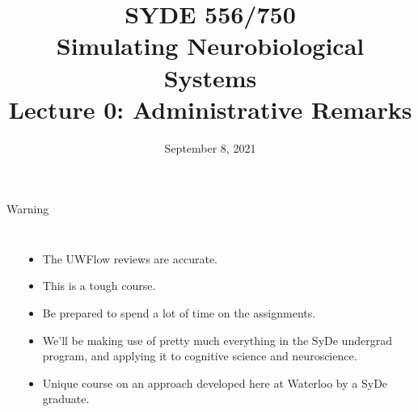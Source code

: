 \documentclass[aspectratio=169]{beamer}
\date{September 8, 2021}
\title{SYDE 556/750 \\ Simulating Neurobiological Systems \\ Lecture 0: Administrative Remarks}
\begin{document}
	
\begin{frame}{}
	\MakeTitle
\end{frame}

\begin{frame}{Warning}
	\begin{columns}[T]
		\fboxrule=0.4pt\fboxsep=0pt\\
		\begin{itemize}
			\item The UWFlow reviews are accurate. 
			\item This is a tough course.
			\item Be prepared to spend a lot of time on the assignments.
			\item We'll be making use of pretty much everything in the SyDe undergrad
			      program, and applying it to cognitive science and neuroscience.
			\item Unique course on an approach developed here at Waterloo by a SyDe graduate.
		\end{itemize}
	\end{columns}
\end{frame}
\end{document}
